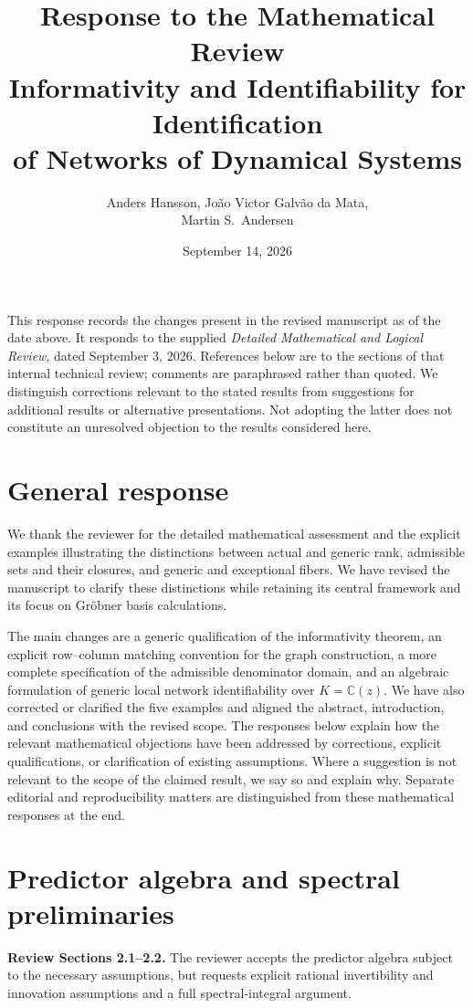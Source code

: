 \documentclass[11pt]{article}
\title{Response to the Mathematical Review\\
\large Informativity and Identifiability for Identification\\
of Networks of Dynamical Systems}
\author{Anders Hansson, Jo\~ao Victor Galv\~ao da Mata,\\Martin S.~Andersen}
\date{September 14, 2026}
\begin{document}
\maketitle

This response records the changes present in the revised manuscript as of the
date above. It responds to the supplied \emph{Detailed Mathematical and Logical
Review}, dated September 3, 2026. References below are to the sections of that
internal technical review; comments are paraphrased rather than quoted.
We distinguish corrections relevant to the stated results from suggestions for
additional results or alternative presentations. Not adopting the latter does
not constitute an unresolved objection to the results considered here.

\section*{General response}

We thank the reviewer for the detailed mathematical assessment and the explicit
examples illustrating the distinctions between actual and generic rank,
admissible sets and their closures, and generic and exceptional fibers.
We have revised the manuscript to clarify these distinctions while retaining its
central framework and its focus on Gr\"obner basis calculations.

The main changes are a generic qualification of the informativity theorem,
an explicit row--column matching convention for the graph construction,
a more complete specification of the admissible denominator domain, and an
algebraic formulation of generic local network identifiability over
$K=\mathbb C(z)$. We have also corrected or clarified the five examples and
aligned the abstract, introduction, and conclusions with the revised scope.
The responses below explain how the relevant mathematical objections have been
addressed by corrections, explicit qualifications, or clarification of existing
assumptions. Where a suggestion is not relevant to the scope of the claimed
result, we say so and explain why. Separate editorial and reproducibility
matters are distinguished from these mathematical responses at the end.

\section{Predictor algebra and spectral preliminaries}
\textbf{Review Sections 2.1--2.2.}
The reviewer accepts the predictor algebra subject to the necessary assumptions,
but requests explicit rational invertibility and innovation assumptions and a
full spectral-integral argument.
\end{document}
